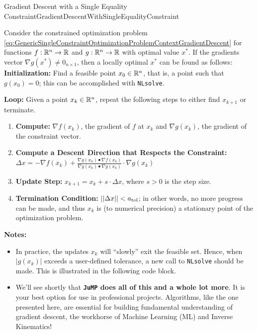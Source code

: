 \begin{methodColor}{Gradient Descent with a Single Equality Constraint}{GradientDescentWithSingleEqualityConstraint} 

Consider the constrained optimization problem \eqref{eq:GenericSingleConstraintOptimizationProblemContextGradientDescent} for functions $f:\mathbb R^n \to \mathbb R$ and $g:\mathbb R^n \to \mathbb R$ with optimal value $x^\ast$. If the gradients vector $\nabla g(x^\ast) \neq 0_{n \times 1}$, then a locally optimal $x^\ast$ 
can be found as follows: \\


\textbf{Initialization:} Find a feasible point $x_0\in \mathbb R^n$, that is, a point such that $g(x_0) = 0$; this can be accomplished with \texttt{NLsolve}.

\bigskip

\textbf{Loop:} Given a point $x_k \in \mathbb R^n$, repeat the following steps to either find $x_{k+1}$ or terminate.

\begin{enumerate}
\renewcommand{\labelenumi}{(\alph{enumi})}
\setlength{\itemsep}{.2cm}

    \item \textbf{Compute:} $\nabla f(x_k)$, the gradient of $f$ at $x_k$ and $\nabla g(x_k)$, the gradient of the constraint vector. \\

 
   \item \textbf{Compute a Descent Direction that Respects the Constraint:} $ \Delta x =  - \nabla f(x_k) + \frac{\nabla g(x_k) \bullet \nabla f(x_k)}{\nabla g(x_k) \bullet \nabla g(x_k)} \cdot \nabla g(x_k)$

   \item \textbf{Update Step:} $x_{k+1}= x_k + s \cdot \Delta x$, where $s>0$ is the step size.

    \item \textbf{Termination Condition:} $||\Delta x|| < a_{\rm tol}$; in other words, no more progress can be made, and thus $x_k$ is (to numerical precision) a stationary point of the optimization problem.
\end{enumerate}


\textbf{Notes:} 
\begin{itemize}
    \item In practice, the updates $x_k$ will ``slowly'' exit the feasible set. Hence, when $|g(x_k)|$ exceeds a user-defined tolerance, a new call to \texttt{NLsolve} should be made. This is illustrated in the following code block.
    \item We'll see shortly that \textbf{\texttt{JuMP} does all of this and a whole lot more}. It is your best option for use in professional projects. Algorithms, like the one presented here, are essential for building fundamental understanding of gradient descent, the workhorse of Machine Learning (ML) and Inverse Kinematics!
\end{itemize}   
\end{methodColor}

